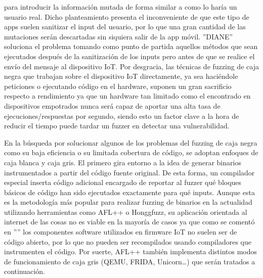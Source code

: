 para introducir la información mutada de forma similar a como lo haría un usuario real. Dicho planteamiento presenta el inconveniente de que este tipo 
de apps suelen sanitizar el input del usuario, por lo que una gran cantidad de las mutaciones serán descartadas sin siquiera salir de la app móvil.
''DIANE'' soluciona el problema tomando como punto de partida aquellos métodos que sean ejecutados después de la sanitización de los inputs pero antes de
que se realice el envío del mensaje al dispositivo IoT. Por desgracia, las técnicas de fuzzing de caja negra que trabajan sobre el dispositivo IoT
directamente, ya sea haciéndole peticiones o ejecutando código en el hardware, suponen un gran sacrificio respecto a rendimiento ya que un hardware 
tan limitado como el encontrado en dispositivos empotrados nunca será capaz de aportar una alta tasa de ejecuciones/respuestas por segundo, siendo esto un 
factor clave a la hora de reducir el tiempo puede tardar un fuzzer en detectar una vulnerabilidad.

En la búsqueda por solucionar algunos de los problemas del fuzzing de caja negra como su baja eficiencia o su limitada cobertura de código, se 
adoptan enfoques de caja blanca y caja gris. El primero gira entorno a la idea de generar binarios instrumentados a partir del código fuente original. De esta forma, un compilador 
especial inserta código adicional encargado de reportar al fuzzer qué bloques básicos de código han sido ejecutados exactamente para qué inputs.
Aunque esta es la metodología más popular para realizar fuzzing de binarios en la actualidad utilizando herramientas como AFL++\cite{afl++} o 
Honggfuzz\cite{honggfuzz}, su aplicación orientada al internet de las cosas no es viable en la mayoría de casos ya que como se comentó en 
'''' los componentes software utilizados en firmware IoT no suelen ser de código abierto, por lo que no pueden ser recompilados 
usando compiladores que instrumenten el código. Por suerte, AFL++ también implementa distintos modos de funcionamiento de caja gris
(QEMU\cite{qemuafl}, FRIDA\cite{frida}, Unicorn\cite{unicorn}\dots) que serán tratados a continuación.\bigskip

